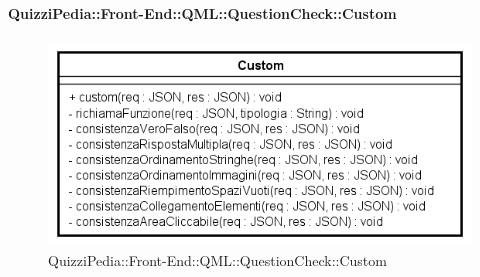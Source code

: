 \paragraph[QuizziPedia::Front-End::QML\\::QuestionCheck::Custom]{QuizziPedia::Front-End::QML::QuestionCheck::Custom}
\begin{figure} [ht]
	\centering
	\includegraphics[scale=0.80]{UML/Classi/Front-End/QuizziPedia_Front-End_QML_QuestionCheck_Custom.png}
	\caption{QuizziPedia::Front-End::QML::QuestionCheck::Custom}
\end{figure} \FloatBarrier

